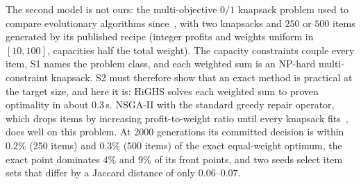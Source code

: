 \documentclass[systems,article,submit,moreauthors,pdftex]{Definitions/mdpi}
\begin{document}
The second model is not ours: the multi-objective $0/1$ knapsack problem used to compare
evolutionary algorithms since~\cite{zitzler1999spea}, with two knapsacks and $250$ or $500$
items generated by its published recipe (integer profits and weights uniform in $[10, 100]$,
capacities half the total weight). The capacity constraints couple every item, S1 names the
problem class, and each weighted sum is an NP-hard multi-constraint knapsack. S2 must therefore
show that an exact method is practical at the target size, and here it is: HiGHS solves each
weighted sum to proven optimality in about $0.3$\,s. NSGA-II with the standard greedy repair
operator, which drops items by increasing profit-to-weight ratio until every knapsack
fits~\cite{zitzler1999spea}, does well on this problem. At $2000$ generations its committed
decision is within $0.2\%$ (250 items) and $0.3\%$ (500 items) of the exact equal-weight optimum,
the exact point dominates $4\%$ and $9\%$ of its front points, and two seeds select item sets
that differ by a Jaccard distance of only $0.06$--$0.07$.
\end{document}
